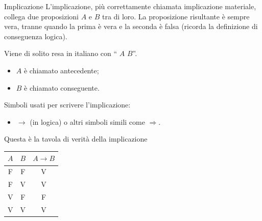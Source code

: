 \documentclass[aspectratio=169,10pt,dvipsnames,handout]{beamer}
\begin{document}
\begin{frame}{Implicazione}
    L'\alert{implicazione}, più correttamente chiamata \alert{implicazione materiale}, collega due proposizioni $A$ e $B$ tra di loro. La proposizione risultante è sempre vera, tranne quando la prima è vera e la seconda è falsa (ricorda la definizione di conseguenza logica).

    \medskip
    Viene di solito resa in italiano con `` $A$  $B$''.
    \begin{itemize}
        \item $A$ è chiamato \alert{antecedente};
        \item $B$ è chiamato \alert{conseguente}.
    \end{itemize}

    \medskip
    Simboli usati per scrivere l'implicazione:
    \begin{itemize}
        \item \alert{$\to$ (in logica)} o altri simboli simili come $\Rightarrow$.
    \end{itemize}

    \pause
    \medskip
    Questa è la tavola di verità della implicazione

    \medskip
    \begin{center}
        \begin{tabular}{c|c||c}
            $A$ & $B$ & $A \to B$ \\
            \hline
            F   & F   & V         \\
            F   & V   & V         \\
            V   & F   & F         \\
            V   & V   & V
        \end{tabular}
    \end{center}
\end{frame}
\end{document}
